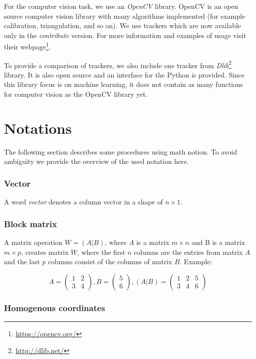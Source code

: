 For the computer vision task, we use an \emph{OpenCV} library. OpenCV is an open
source computer vision library with many algorithms implemented (for example
calibration, triangulation, and so on). We use trackers which are now available
only in the \emph{contribute} version. For more information and examples of usage
visit their webpage\footnote{\url{https://opencv.org/}}.

To provide a comparison of trackers, we also include one tracker from
\emph{Dlib}\footnote{\url{http://dlib.net/}} library. It is also open source
and an interface for the Python is provided.  Since this library focus is on
machine learning, it does not contain as many functions for computer vision
as the OpenCV library yet.

\section{Notations}

The following section describes some procedures using math notion. To avoid
ambiguity we provide the overview of the used notation here.

\subsubsection*{Vector}
A word \emph{vector} denotes a column vector in a shape of $n\times1$.

\subsubsection*{Block matrix}
A matrix operation $W = (A|B)$, where $A$ is a matrix $m \times n$ and B is a
matrix $m \times p$, creates matrix $W$, where the first $n$ columns are the entries from
matrix $A$ and the last $p$ columns consist of the columns of matrix $B$.
Example:

\[
A = \begin{pmatrix}
        1 & 2 \\
        3 & 4
\end{pmatrix},
B = \begin{pmatrix}
5 \\
6
\end{pmatrix},
(A|B) = \begin{pmatrix}
        1 & 2 & 5 \\
        3 & 4 & 6
\end{pmatrix}
\]

\subsubsection*{Homogenous coordinates}

